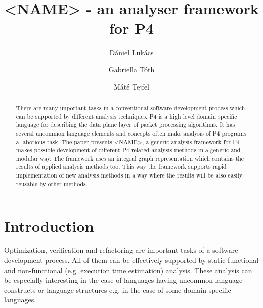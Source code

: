 \documentclass[sigconf]{acmart}
\begin{document}
	
	
	\title{<NAME> - an analyser framework for P4}
	
	
	\author{Dániel Lukács}
	
	\author{Gabriella Tóth}
	
	\author{Máté Tejfel}
	
	
	\begin{abstract}
		There are many important tasks in a conventional software development process which can be supported by different analysis techniques. P4 is a high level domain specific language for
describing the data plane layer of packet processing algorithms. It has several uncommon language elements and concepts often make analysis of P4 programs a laborious task. 
The paper presents <NAME>, a generic analysis framework for P4 makes possible development of different P4 related analysis methods in a generic and modular way. The framework uses an integral graph representation which contains the results of applied analysis methods too. This way the framework supports rapid implementation of new analysis methods in a way where the results will be also easily reusable by other methods. 

	\end{abstract}
	

	
	
	
	\maketitle
	
	\section{Introduction}
	  Optimization, verification and refactoring are important tasks of a software development process. All of them can be effectively supported by static functional and non-functional (e.g. execution time estimation) analysis. These analysis can be especially interesting in the case of languages having uncommon language constructs or language structures e.g. in the case of some domain specific languages. 
	
\end{document}
